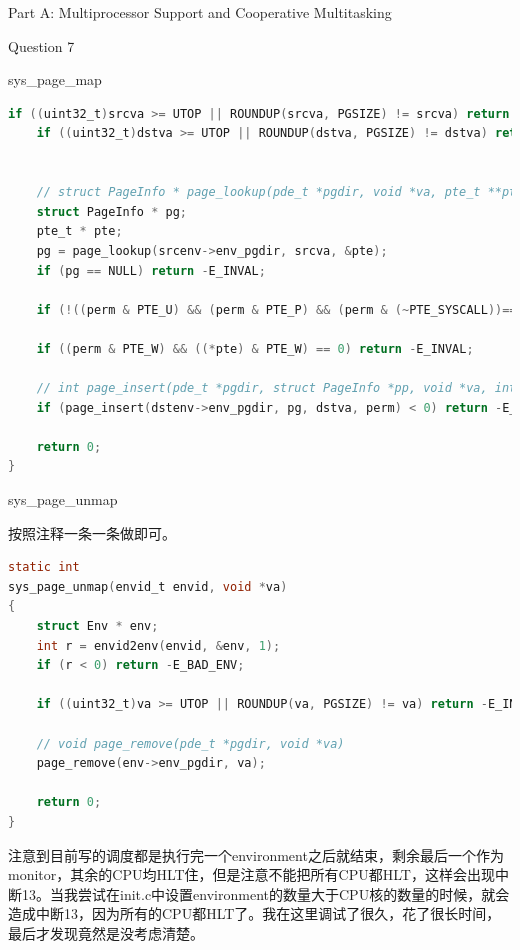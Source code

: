 \documentclass[GBK,winfonts,a4paper,10pt]{ctexart}
\begin{document}
\begin{section}{Part A: Multiprocessor Support and Cooperative Multitasking}
\begin{subsection}{Question 7}
\begin{subsubsection}{sys\_page\_map}
\begin{lstlisting}[language=C]
	if ((uint32_t)srcva >= UTOP || ROUNDUP(srcva, PGSIZE) != srcva) return -E_INVAL;
	if ((uint32_t)dstva >= UTOP || ROUNDUP(dstva, PGSIZE) != dstva) return -E_INVAL;


	// struct PageInfo * page_lookup(pde_t *pgdir, void *va, pte_t **pte_store)
	struct PageInfo * pg;
	pte_t * pte;
	pg = page_lookup(srcenv->env_pgdir, srcva, &pte);
	if (pg == NULL) return -E_INVAL;		

	if (!((perm & PTE_U) && (perm & PTE_P) && (perm & (~PTE_SYSCALL))==0)) return -E_INVAL;
	
	if ((perm & PTE_W) && ((*pte) & PTE_W) == 0) return -E_INVAL;

	// int page_insert(pde_t *pgdir, struct PageInfo *pp, void *va, int perm)
	if (page_insert(dstenv->env_pgdir, pg, dstva, perm) < 0) return -E_NO_MEM;

	return 0;
}
\end{lstlisting}
\end{subsubsection}

\begin{subsubsection}{sys\_page\_unmap}
\par
按照注释一条一条做即可。
\begin{lstlisting}[language=C]
static int
sys_page_unmap(envid_t envid, void *va)
{
	struct Env * env;
	int r = envid2env(envid, &env, 1);
	if (r < 0) return -E_BAD_ENV;

	if ((uint32_t)va >= UTOP || ROUNDUP(va, PGSIZE) != va) return -E_INVAL;
	
	// void page_remove(pde_t *pgdir, void *va)
	page_remove(env->env_pgdir, va);

	return 0;
}
\end{lstlisting}	
\end{subsubsection}

\par
注意到目前写的调度都是执行完一个environment之后就结束，剩余最后一个作为monitor，其余的CPU均HLT住，但是注意不能把所有CPU都HLT，这样会出现中断13。当我尝试在init.c中设置environment的数量大于CPU核的数量的时候，就会造成中断13，因为所有的CPU都HLT了。我在这里调试了很久，花了很长时间，最后才发现竟然是没考虑清楚。
\end{subsection}

\end{section}
\end{document}
